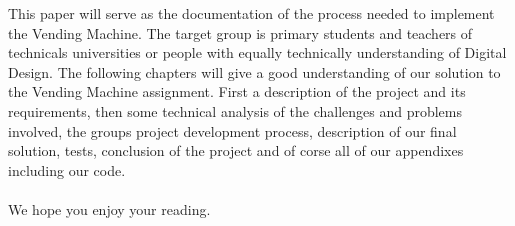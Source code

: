 This paper will serve as the documentation of the process needed to implement the Vending Machine.
The target group is primary students and teachers of technicals universities or people with equally technically understanding of Digital Design. 
The following chapters will give a good understanding of our solution to the Vending Machine assignment. First a description of the project and its requirements, then some technical analysis of the challenges and problems involved, the groups project development process, description of our final solution, tests, conclusion of the project and of corse all of our appendixes including our code. 
\\ \\
We hope you enjoy your reading.



